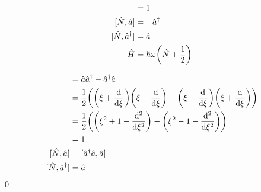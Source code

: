 \documentclass[uplatex,dvipdfmx,a4paper,11pt]{jlreq}
\makeatletter
\theoremstyle{definition}
\renewenvironment{proof}[1][\proofname]{\par
  \normalfont
  \topsep6\p@\@plus6\p@ \trivlist
  \item[\hskip\labelsep{\bfseries #1}\@addpunct{\bfseries}]\ignorespaces\quad\par
}{%
  \qed\endtrivlist\@endpefalse
}
\renewcommand\proofname{証明}
\makeatother
\begin{document}
\begin{proposition}
  \begin{align}
    [\hat{a}, \hat{a}^\dagger] & = 1                                      \\
    [\hat{N}, \hat{a}]         & = -\hat{a}^\dagger                       \\
    [\hat{N}, \hat{a}^\dagger] & = \hat{a}                                \\
    \hat{H}                    & = \hbar\omega\qty(\hat{N} + \frac{1}{2})
  \end{align}
\end{proposition}
\begin{proof}
  \begin{align}
    [\hat{a}, \hat{a}^\dagger] & = \hat{a}\hat{a}^\dagger - \hat{a}^\dagger\hat{a}                                                      \\
                               & = \frac{1}{2}\qty(\qty(\xi + \dv{\xi})\qty(\xi - \dv{\xi}) - \qty(\xi - \dv{\xi})\qty(\xi + \dv{\xi})) \\
                               & = \frac{1}{2}\qty(\qty(\xi^2 + 1 - \dv[2]{\xi}) - \qty(\xi^2 - 1 - \dv[2]{\xi}))                       \\
                               & = 1                                                                                                    \\
    [\hat{N}, \hat{a}]         & = [\hat{a}^\dagger\hat{a}, \hat{a}] =                                                                  \\
    [\hat{N}, \hat{a}^\dagger] & = \hat{a}                                                                                              \\
  \end{align}
\end{proof}
\end{document}
